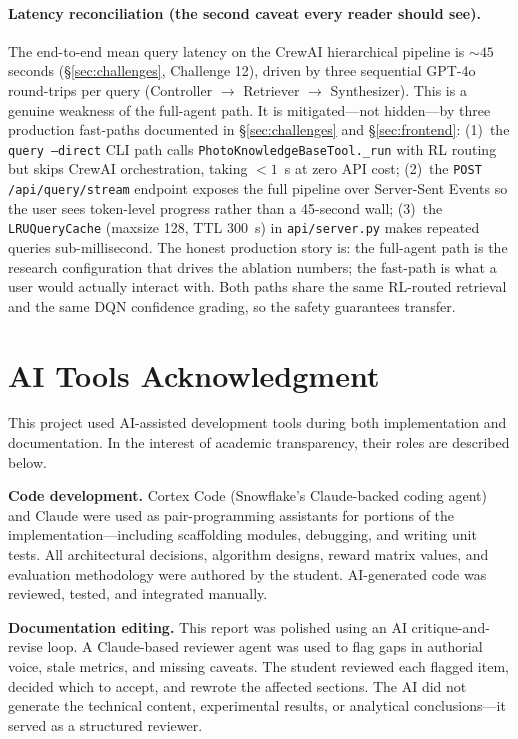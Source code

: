 \documentclass[11pt,letterpaper]{article}
\begin{document}
\paragraph{Latency reconciliation (the second caveat every reader should see).} The end-to-end mean query latency on the CrewAI hierarchical pipeline is ${\sim}45$ seconds (\S\ref{sec:challenges}, Challenge 12), driven by three sequential GPT-4o round-trips per query (Controller $\to$ Retriever $\to$ Synthesizer). This is a genuine weakness of the full-agent path. It is mitigated---not hidden---by three production fast-paths documented in \S\ref{sec:challenges} and \S\ref{sec:frontend}: (1)~the \texttt{query --direct} CLI path calls \texttt{PhotoKnowledgeBaseTool.\_run} with RL routing but skips CrewAI orchestration, taking $<1$~s at zero API cost; (2)~the \texttt{POST /api/query/stream} endpoint exposes the full pipeline over Server-Sent Events so the user sees token-level progress rather than a 45-second wall; (3)~the \texttt{LRUQueryCache} (maxsize 128, TTL 300~s) in \texttt{api/server.py} makes repeated queries sub-millisecond. The honest production story is: the full-agent path is the research configuration that drives the ablation numbers; the fast-path is what a user would actually interact with. Both paths share the same RL-routed retrieval and the same DQN confidence grading, so the safety guarantees transfer.

\section*{AI Tools Acknowledgment}

This project used AI-assisted development tools during both implementation and documentation. In the interest of academic transparency, their roles are described below.

\textbf{Code development.} Cortex Code (Snowflake's Claude-backed coding agent) and Claude were used as pair-programming assistants for portions of the implementation---including scaffolding modules, debugging, and writing unit tests. All architectural decisions, algorithm designs, reward matrix values, and evaluation methodology were authored by the student. AI-generated code was reviewed, tested, and integrated manually.

\textbf{Documentation editing.} This report was polished using an AI critique-and-revise loop. A Claude-based reviewer agent was used to flag gaps in authorial voice, stale metrics, and missing caveats. The student reviewed each flagged item, decided which to accept, and rewrote the affected sections. The AI did not generate the technical content, experimental results, or analytical conclusions---it served as a structured reviewer.
\end{document}
